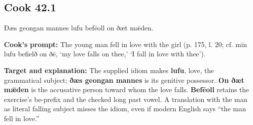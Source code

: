 \par\begin{minipage}{\linewidth}\raggedright
\subsection*{Cook 42.1}

Ðæs geongan mannes lufu befēoll on ðæt mǣden.

\textbf{Cook's prompt:} The young man fell in love with the girl (p. 175, l. 20; cf. mīn lufu befielð on ðē, ‘my love falls on thee,’ ‘I fall in love with thee’).

\textbf{Target and explanation:} The supplied idiom makes \textbf{lufu}, love, the grammatical subject; \textbf{ðæs geongan mannes} is its genitive possessor. \textbf{On ðæt mǣden} is the accusative person toward whom the love falls. \textbf{Befēoll} retains the exercise's be-prefix and the checked long past vowel. A translation with the man as literal falling subject misses the idiom, even if modern English says “the man fell in love.”

\end{minipage}\par\addvspace{4pt}

